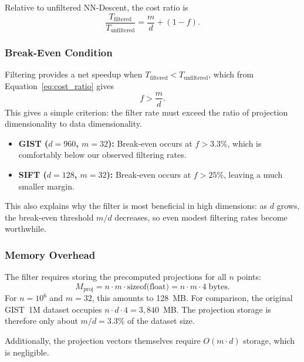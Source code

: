 Relative to unfiltered NN-Descent, the cost ratio is
\begin{equation}
    \frac{T_{\text{filtered}}}{T_{\text{unfiltered}}} = \frac{m}{d} + (1 - f).
    \label{eq:cost_ratio}
\end{equation}

\subsubsection{Break-Even Condition}
\label{sec:breakeven}

Filtering provides a net speedup when $T_{\text{filtered}} < T_{\text{unfiltered}}$, which from Equation~\eqref{eq:cost_ratio} gives
\begin{equation}
    f > \frac{m}{d}.
    \label{eq:breakeven}
\end{equation}
This gives a simple criterion: the filter rate must exceed the ratio of projection dimensionality to data dimensionality.

\begin{itemize}
    \item \textbf{GIST ($d = 960$, $m = 32$):} Break-even occurs at $f > 3.3\%$, which is comfortably below our observed filtering rates.
    \item \textbf{SIFT ($d = 128$, $m = 32$):} Break-even occurs at $f > 25\%$, leaving a much smaller margin.
\end{itemize}

This also explains why the filter is most beneficial in high dimensions: as $d$ grows, the break-even threshold $m/d$ decreases, so even modest filtering rates become worthwhile.

\subsubsection{Memory Overhead}
\label{sec:memory}

The filter requires storing the precomputed projections for all $n$ points:
\begin{equation}
    M_{\text{proj}} = n \cdot m \cdot \text{sizeof(float)} = n \cdot m \cdot 4 \;\text{bytes}.
    \label{eq:memory}
\end{equation}
For $n = 10^6$ and $m = 32$, this amounts to 128~MB. For comparison, the original GIST~1M dataset occupies $n \cdot d \cdot 4 = 3{,}840$~MB. The projection storage is therefore only about $m/d = 3.3\%$ of the dataset size.

Additionally, the projection vectors themselves require $O(m \cdot d)$ storage, which is negligible.

